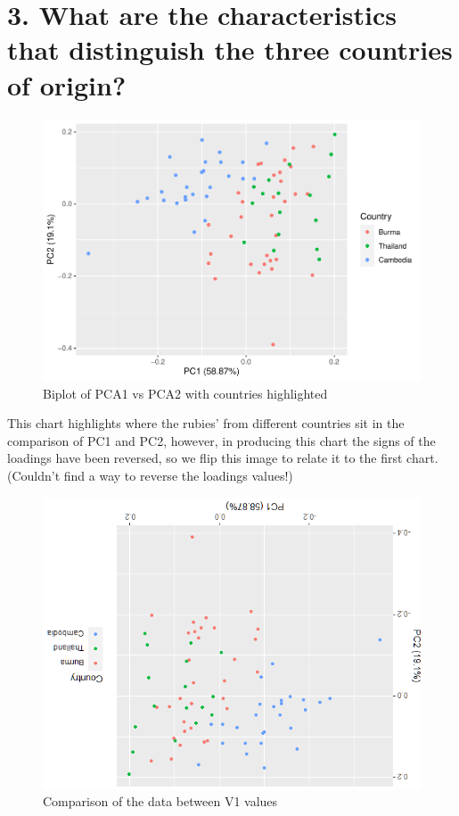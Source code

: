 \documentclass[
  8pt,
]{article}
\begin{document}
\hypertarget{what-are-the-characteristics-that-distinguish-the-three-countries-of-origin}{%
\section{3. What are the characteristics that distinguish the three
countries of
origin?}\label{what-are-the-characteristics-that-distinguish-the-three-countries-of-origin}}

\begin{figure}

{\centering \includegraphics[width=0.65\linewidth,height=0.65\textheight]{Report_files/figure-latex/2.3-1} 

}

\caption{Biplot of PCA1 vs PCA2 with countries highlighted}\label{fig:2.3}
\end{figure}

This chart highlights where the rubies' from different countries sit in
the comparison of PC1 and PC2, however, in producing this chart the
signs of the loadings have been reversed, so we flip this image to
relate it to the first chart. (Couldn't find a way to reverse the
loadings values!)

\begin{figure}
\centering
\includegraphics{2-3.png}
\caption{Comparison of the data between V1 values}
\end{figure}
\end{document}
